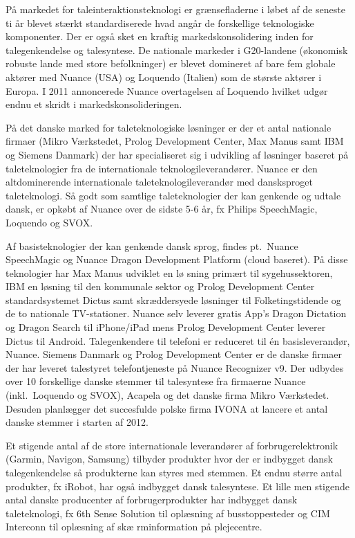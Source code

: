 \begin{multicols}{2}
\mbox{P\aa} markedet for taleinteraktionsteknologi er gr\ae nsefladerne i l\o bet af de seneste ti \aa r blevet st\ae rkt standardiserede hvad ang\aa r de forskellige teknologiske komponenter. Der er \mbox{ogs\aa} sket en kraftig markedskonsoli\-dering inden for talegenkendelse og talesyntese. De nationale markeder i G20-landene  (\o konomisk robuste lande med store befolkninger) er blevet domineret af bare fem globale akt\o rer med Nuance (USA) og Loquendo (Italien) som de st\o rste akt\o rer i Europa. I 2011 annoncerede Nuance overtagelsen af Loquendo hvilket udg\o r endnu et skridt i markedskonsolideringen. 

\mbox{P\aa} det danske marked for taleteknologiske l\o sninger er der
et antal nationale firmaer (Mikro V\ae rkstedet, Prolog Development
Center, Max Manus samt IBM og Siemens Danmark) der har specialiseret
sig i udvikling af l\o sninger baseret \mbox{p\aa} taleteknologier fra
de internationale teknologileverand\o rer. Nuance er den
altdominerende internationale taleteknologileverand\o r med
dansksproget taleteknologi. \mbox{S\aa} godt som samtlige
taleteknologier der kan genkende og udtale dansk, er opk\o bt af
Nuance over de sidste 5-6 \aa r, fx Philips SpeechMagic, Loquendo og
SVOX.

Af basisteknologier der kan genkende dansk sprog, findes pt.\ Nuance
SpeechMagic og Nuance Dragon Development Platform (cloud
baseret). \mbox{P\aa} disse teknologier har Max Manus udviklet en l\o
sning prim\ae rt til sygehussektoren, IBM en l\o sning til den
kommunale sektor og Prolog Development Center standardsystemet Dictus
samt skr\ae ddersyede l\o sninger til Folketingstidende og de to
nationale TV-stationer. Nuance selv leverer gratis App's Dragon
Dictation og Dragon Search til iPhone/iPad mens Prolog Development
Center leverer Dictus til Android. Talegenkendere til telefoni er
reduceret til \'{e}n basisleverand\o r, Nuance. Siemens Danmark og
Prolog Development Center er de danske firmaer der har leveret
talestyret telefontjeneste \mbox{p\aa} Nuance Recognizer v9. Der udbydes over 10 forskellige danske stemmer til talesyntese fra
firmaerne Nuance (inkl.\ Loquendo og SVOX), Acapela og det danske firma
Mikro V\ae rkstedet. Desuden planl\ae gger det succesfulde polske
firma IVONA at lancere et antal danske stemmer i starten af 2012.

Et stigende antal af de store internationale leverand\o rer af
forbrugerelektronik (Garmin, Navigon, Samsung) tilbyder produkter hvor
der er indbygget dansk talegenkendelse \mbox{s\aa} produkterne kan
styres med stemmen. Et endnu st\o rre antal produkter, fx iRobot, har
\mbox{ogs\aa} indbygget dansk talesyntese. Et lille men stigende antal
danske producenter af forbrugerprodukter har indbygget dansk
taleteknologi, fx 6th Sense Solution til opl\ae sning af
busstoppesteder og CIM Interconn til opl\ae sning af sk\ae
rminformation \mbox{p\aa} plejecentre.


\end{multicols}
